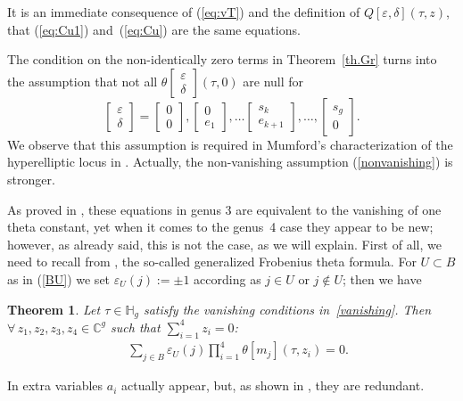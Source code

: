 \documentclass[11pt]{article}
\numberwithin{equation}{section}
\numberwithin{equation}{section}
\newtheorem{Theorem}{Theorem}[section]
\newcommand{\de}{\delta}
\newcommand{\ep}{\varepsilon}
\newcommand{\CC}{{\mathbb{C}}}
\newcommand{\HH}{{\mathbb{H}}}
\begin{document}
It is an immediate consequence of (\ref{eq:vT}) and the definition of $ Q[\ep,\de](\tau, z)$, that (\ref{eq:Cu1}) and~(\ref{eq:Cu}) are the same equations.

The condition on the non-identically zero terms in Theorem~\ref{th.Gr} turns into the assumption that not all $\theta\left[\begin{smallmatrix}\ep \\ \de\end{smallmatrix}\right](\tau,0) $ are null for
 \[
 \begin{bmatrix} \ep \\ \de\end{bmatrix} =\begin{bmatrix} 0 \\ 0 \end{bmatrix} ,\begin{bmatrix} 0 \\ e_{1}\end{bmatrix}, \dots\begin{bmatrix} s_k \\ e_{k+1} \end{bmatrix},\dots,\begin{bmatrix} s_g \\ 0
\end{bmatrix}.
\]
We observe that this assumption is required in Mumford's characterization of the hyperelliptic locus in \cite{mu}. Actually, the non-vanishing assumption (\ref{nonvanishing}) is stronger.

As proved in \cite{Gr}, these equations in genus 3 are
equivalent to the vanishing of one theta constant, yet when it comes to the genus~4 case they appear to be new; however, as already said, this is not the case, as we will explain. First of all, we need to recall from \cite[Theorem~7.1]{mu}, the so-called generalized Frobenius theta formula. For $U\subset B$ as in (\ref{BU}) we set $\ep_U(j):= \pm1$ according as $j\in U$ or $j\notin U$; then we have

\begin{Theorem} Let $\tau\in\HH_g$ satisfy the vanishing conditions in~\eqref{vanishing}. Then $\forall\, z_1, z_2, z_3, z_4 \in\CC^g$ such that $ \sum\limits_{i=1}^4 z_i=0$:
\begin{gather}\label{eq:FR} \quad \sum_{j\in B} \ep_U(j)\prod_{i=1}^4\theta[m_j](\tau, z_i)=0 . \end{gather}
\end{Theorem}

In \cite{mu} extra variables $a_i$ actually appear, but, as shown in \cite{po}, they are redundant.
\end{document}
